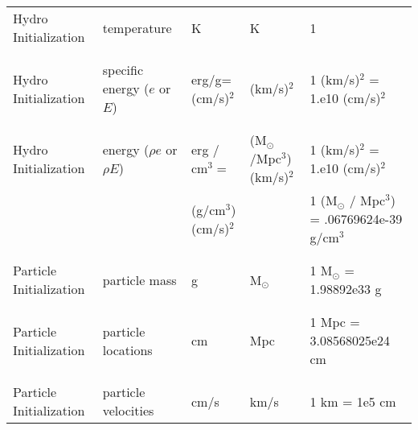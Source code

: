 \begin{table*}[h]
\begin{scriptsize}
\begin{center}
\begin{tabular}{|l|l|l|l|l|}
Hydro Initialization    & temperature                               & K           
                                                                    & K             
                                                                    & 1             \\ 
          & & & & \\ \hline 
          & & & & \\
Hydro Initialization    & specific energy ($e$ or $E$)              & erg/g= (cm/s)$^2$         
                                                                    & (km/s)$^2$
                                                                    & 1 (km/s)$^2$ = 1.e10 (cm/s)$^2$ \\   
          & & & & \\ \hline 
          & & & & \\
Hydro Initialization    & energy ($\rho e$ or $\rho E$)             & erg / cm$^3 = $ 
                                                                    & (M$_\odot$/Mpc$^3$) (km/s)$^2$ 
                                                                    &  1 (km/s)$^2$ = 1.e10 (cm/s)$^2$ \\   
          & & (g/cm$^3$) (cm/s)$^2$  & &  1 (M$_\odot$ / Mpc$^3$) = .06769624e-39 g/cm$^3$  \\
          & & & & \\ \hline 
          & & & & \\
Particle Initialization & particle mass                             & g   
                                                                    & M$_\odot$      
                                                                    & 1 M$_\odot$ = 1.98892e33 g  \\   
          & & & & \\ \hline 
          & & & & \\
Particle Initialization & particle locations                        & {\rm cm}           
                                                                    & {\rm Mpc}          
                                                                    & 1 Mpc = 3.08568025e24 cm  \\
          & & & & \\ \hline 
          & & & & \\
Particle Initialization & particle velocities                       & cm/s 
                                                                    & km/s  
                                                                    & 1 km = 1e5 cm \\

\end{tabular}
\end{center}
\end{scriptsize}
\end{table*}
